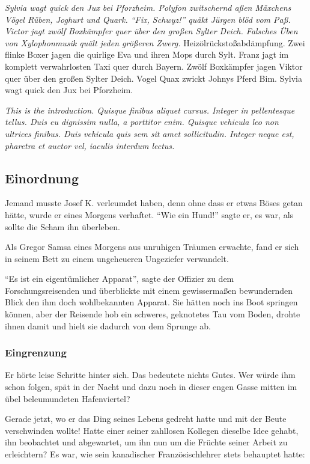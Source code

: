 \emph{Sylvia wagt quick den Jux bei \emph{Pforzheim}. Polyfon
zwitschernd aßen Mäxchens Vögel Rüben, Joghurt und Quark.
\enquote{Fix, Schwyz!} quäkt Jürgen blöd vom Paß. Victor jagt zwölf
Boxkämpfer quer über den großen Sylter Deich. Falsches Üben von
\emph{Xylophonmusik} quält jeden größeren Zwerg.}
Heizölrückstoßabdämpfung. Zwei flinke Boxer jagen die quirlige Eva
und ihren Mops durch Sylt. Franz jagt im komplett verwahrlosten Taxi
quer durch Bayern. Zwölf Boxkämpfer jagen Viktor quer über den
großen Sylter Deich. Vogel Quax zwickt Johnys Pferd Bim. Sylvia wagt
quick den Jux bei Pforzheim.

\emph{This is the introduction. Quisque finibus aliquet cursus.
Integer in pellentesque tellus. Duis eu dignissim nulla, a porttitor
enim. Quisque vehicula leo non ultrices finibus. Duis vehicula quis
sem sit amet sollicitudin. Integer neque est, pharetra et auctor
vel, iaculis interdum lectus.}

\hypertarget{einordnung}{%
\subsection{Einordnung}\label{einordnung}}

Jemand musste Josef K. verleumdet haben, denn ohne dass er etwas
Böses getan hätte, wurde er eines Morgens verhaftet. \enquote{Wie
ein Hund!} sagte er, es war, als sollte die Scham ihn überleben.

Als Gregor Samsa eines Morgens aus unruhigen Träumen erwachte, fand
er sich in seinem Bett zu einem ungeheueren Ungeziefer verwandelt.

\enquote{Es ist ein eigentümlicher Apparat}, sagte der Offizier zu
dem Forschungsreisenden und überblickte mit einem gewissermaßen
bewundernden Blick den ihm doch wohlbekannten Apparat. Sie hätten
noch ins Boot springen können, aber der Reisende hob ein schweres,
geknotetes Tau vom Boden, drohte ihnen damit und hielt sie dadurch
von dem Sprunge ab.

\hypertarget{eingrenzung}{%
\subsubsection{Eingrenzung}\label{eingrenzung}}

Er hörte leise Schritte hinter sich. Das bedeutete nichts Gutes. Wer
würde ihm schon folgen, spät in der Nacht und dazu noch in dieser
engen Gasse mitten im übel beleumundeten Hafenviertel?

Gerade jetzt, wo er das Ding seines Lebens gedreht hatte und mit der
Beute verschwinden wollte! Hatte einer seiner zahllosen Kollegen
dieselbe Idee gehabt, ihn beobachtet und abgewartet, um ihn nun um
die Früchte seiner Arbeit zu erleichtern? Es war, wie sein
kanadischer Französischlehrer stets behauptet hatte:

